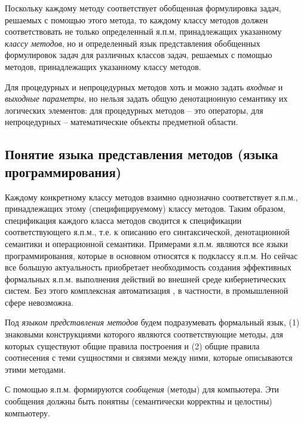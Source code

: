 Поскольку каждому методу соответствует обобщенная формулировка задач, решаемых с помощью этого метода, то каждому классу методов должен соответствовать не только определенный я.п.м, принадлежащих указанному \textit{классу методов}, но и определенный язык представления обобщенных формулировок задач для различных классов задач, решаемых с помощью методов, принадлежащих указанному классу методов.

Для процедурных и непроцедурных методов хоть и можно задать \textit{входные} и \textit{выходные параметры}, но нельзя задать общую денотационную семантику их логических элементов: для процедурных методов -- это операторы, для непроцедурных -- математические объекты предметной области.

\subsection{Понятие языка представления методов (языка программирования)}
\label{sec_programs_method_representation_language_concept}

Каждому конкретному классу методов взаимно однозначно соответствует я.п.м., принадлежащих этому (специфицируемому) классу методов. Таким образом, спецификация каждого класса методов сводится к спецификации соответствующего я.п.м., т.е. к описанию его синтаксической, денотационной семантики и операционной семантики. Примерами я.п.м. являются все языки программирования, которые в основном относятся к подклассу я.п.м. Но сейчас все большую актуальность приобретает необходимость создания эффективных формальных я.п.м. выполнения действий во внешней среде кибернетических систем. Без этого комплексная автоматизация \cite{Pospelov2021}, в частности, в промышленной сфере невозможна.

Под \textit{языком представления методов} будем подразумевать формальный язык, (1) знаковыми конструкциями которого являются соответствующие методы, для которых существуют общие правила построения и (2) общие правила соотнесения с теми сущностями и связями между ними, которые описываются этими методами.

С помощью я.п.м. формируются \textit{сообщения} (методы) для компьютера. Эти сообщения должны быть понятны (семантически корректны и целостны) компьютеру.

\begin{SCn}
\begin{scnindent}
\end{scnindent}
\end{SCn}

